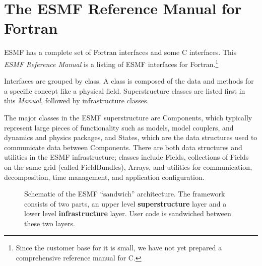 

\section{The ESMF Reference Manual for Fortran}

ESMF has a complete set of Fortran interfaces and
some C interfaces.  This {\it ESMF Reference Manual} is a listing of 
ESMF interfaces for Fortran.\footnote{Since the customer base for it is 
small, we have not yet prepared a comprehensive reference manual for C.}  

Interfaces are grouped by class.  A class is composed of the data and
methods for a specific concept like a physical field.  Superstructure classes 
are listed first in this {\it Manual}, followed by infrastructure 
classes.

The major classes in the ESMF superstructure are Components, which 
typically represent
large pieces of functionality such as models, model couplers, and 
dynamics and physics packages, and States, which are the data structures
used to communicate data between Components.  There are both data
structures and utilities in the ESMF 
infrastructure; classes include Fields, collections of Fields on the 
same grid (called FieldBundles), Arrays, and utilities for communication,
decomposition, time management, and application configuration.

\begin{center}
\begin{figure}
\caption{Schematic of the ESMF ``sandwich'' architecture.
The framework consists of two parts, an upper level
{\bf superstructure} layer and a lower level {\bf infrastructure} layer.
User code is sandwiched between these two layers.}
\label{fig:TheESMFwich}
\end{figure}
\end{center}

